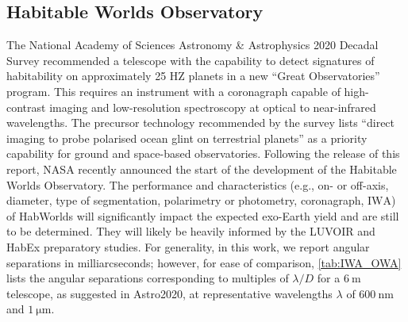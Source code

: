 \documentclass[usenatbib]{mnras}
\newcommand{\IWA}{\ensuremath{\mathrm{IWA}}\xspace}
\newcommand{\OWA}{\ensuremath{\mathrm{OWA}}\xspace}
\newcommand{\HWO}{HabWorlds\xspace}
\newcommand{\Decadal}{Astro2020}  %
\begin{document}
\subsection{Habitable Worlds Observatory}

The National Academy of Sciences Astronomy \& Astrophysics 2020 Decadal Survey \citep[][hereafter \Decadal]{decadal} recommended a telescope with the capability to detect signatures of habitability on approximately 25 HZ planets in a new \enquote{Great Observatories} program.
%
This requires an instrument with a coronagraph capable of high-contrast imaging and low-resolution spectroscopy at optical to near-infrared wavelengths. 
%
The precursor technology recommended by the survey lists \enquote{direct imaging to probe polarised ocean glint on terrestrial planets} as a priority capability \citep[Table E.1 in][]{decadal} for ground and space-based observatories.
%
Following the release of this report, NASA recently announced the start of the development of the Habitable Worlds Observatory.
%
The performance and characteristics (e.g., on- or off-axis, diameter, type of segmentation, polarimetry or photometry, coronagraph, \IWA) of \HWO will significantly impact the expected exo-Earth yield \citep{Stark2019_exoplanetyield} and are still to be determined.
%
They will likely be heavily informed by the LUVOIR \citep{LUVOIR2019} and HabEx \citep{HabEx_2020} preparatory studies.
%
For generality, in this work, we report angular separations in milliarcseconds; however, for ease of comparison, \cref{tab:IWA_OWA} lists the angular separations corresponding to multiples of $\lambda / D$ for a $\qty{6}{\meter}$ telescope, as suggested in \Decadal, at representative wavelengths $\lambda$ of $\qty{600}{\nano\meter}$ and $\qty{1}{\micro\meter}$.

\begin{table}
    \centering
    \caption{
        Inner and Outer Working Angles (\IWA and \OWA{}, respectively) in milliarcseconds (\unit{\mas}) as functions of $\lambda / D$, at wavelengths $\lambda$ of \qty{600}{\nano\meter} and \qty{1}{\micro\meter}, assuming a telescope diameter $D$ of \qty{6}{\meter}.
    }
    \label{tab:IWA_OWA}
    
\end{table}
 
\end{document}
